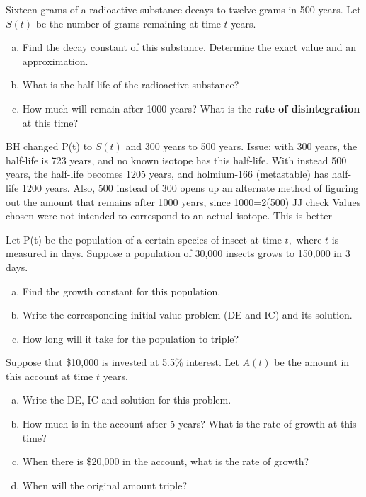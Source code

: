 \documentclass[12pt]{book}
\begin{document}
\vspace{5mm}
\begin{exercise}
{\color{blue}
Sixteen grams of a radioactive substance decays to twelve grams in 500 years.
Let $S(t)$ be the number of grams remaining at time $t$ years.
}
\begin{enumerate}[a)]
    \item Find the decay constant of this substance. Determine the exact value and an approximation.
    \item What is the half-life of the radioactive substance?
    \item How much will remain after 1000 years? What is the \textbf{rate of disintegration} at this time?
\end{enumerate}
\end{exercise}
{\color{teal}BH changed P(t) to $S(t)$ and 300 years to 500 years. 
Issue: with 300 years, the half-life is 723 years, and no known isotope
has this half-life. With instead 500 years, the half-life becomes 1205 years, 
and holmium-166 (metastable) has half-life 1200 years. 
Also, 500 instead of 300 opens up an alternate method of figuring out the amount that remains after 1000 years, since 1000=2(500)
JJ check Values chosen were not intended to correspond to
an actual isotope. This is better
}

\begin{exercise}
Let P(t) be the population of a certain species of insect at time $t,$ where $t$ is measured in days.
Suppose a population of 30,000 insects grows to 150,000 in 3 days.
\begin{enumerate}[a)]
    \item Find the growth constant for this population.
    \item Write the corresponding initial value problem (DE and IC) and its solution.
    \item How long will it take for the population to triple?
\end{enumerate}
\end{exercise}

\begin{exercise}
Suppose that \$10,000 is invested at 5.5\% interest. Let $A(t)$ be the amount in this account at time $t$ years.
\begin{enumerate}[a)]
    \item Write the DE, IC and solution for this problem.
    \item How much is in the account after 5 years? What is the rate of growth at this time?
    \item When there is \$20,000 in the account, what is the rate of growth?
    \item When will the original amount triple?
\end{enumerate}
\end{exercise}
\end{document}
